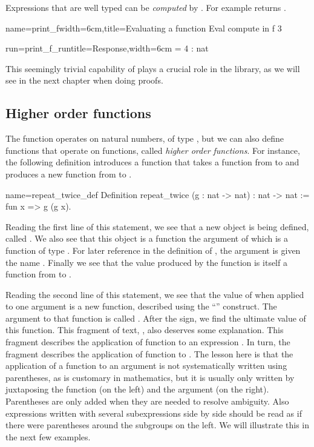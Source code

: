 Expressions that are well typed can be \emph{computed} by \Coq{}.
For example  returns .

\begin{coq}{name=print_f}{width=6cm,title=Evaluating a function}
Eval compute in f 3
\end{coq}
\begin{coqout}{run=print_f_run}{title=Response,width=6cm}
 = 4 : nat
\end{coqout}
This seemingly trivial capability of \Coq{} plays a crucial role
in the \mcbMC{} library, as we will see in the next chapter when
doing proofs.

\subsection{Higher order functions}

The function  operates on natural numbers, of type , but
we can also define functions that operate on functions, called
\emph{higher order functions}.  For instance,
the following definition introduces a function that takes a function
from  to  and produces a new function from  to
.

\begin{coq}{name=repeat_twice_def}{}
Definition repeat_twice (g : nat -> nat) : nat -> nat :=
  fun x => g (g x).
\end{coq}
Reading the first line of this statement, we see that a new object is
being defined, called .  We also see that this object
is a function the argument of which is a function of
type .  For later reference in the definition of
, the argument is given the name .  Finally
we see that the value produced by the function 
is itself a function from  to .

Reading the second line of this statement, we see that the value
of  when applied to one argument is a new
function, described using the ``'' construct.  The
argument to that function is called .  After the \C{=>} sign, we
find the ultimate value of this function.  This fragment of text, , also deserves some explanation.  This fragment describes the
application of function  to an expression .  In turn,
the fragment  describes the application of function  to
.  The lesson here is that the application of a function to an
argument is not systematically written using parentheses, as is
customary in mathematics, but it is usually only written by
juxtaposing the function (on the left) and the argument (on the
right).  Parentheses are only added when they are needed to resolve
ambiguity.  Also expressions written with several subexpressions side
by side should be read as if there were parentheses around the
subgroups on the left.  We will illustrate this in the next few
examples.

